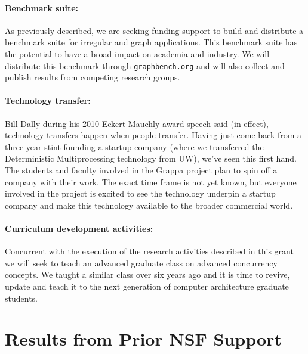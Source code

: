 \paragraph{Benchmark suite:} As previously described, we are seeking funding support to build and distribute a benchmark suite for irregular and graph applications.  This benchmark suite has the potential to have a broad impact on academia and industry.  We will distribute this benchmark through \texttt{graphbench.org} and will also collect and publish results from competing research groups.

\paragraph{Technology transfer:} Bill Dally during his 2010 Eckert-Mauchly award speech said (in effect), technology transfers happen when people transfer.  Having just come back from a three year stint founding a startup company (where we transferred the Deterministic Multiprocessing technology from UW), we've seen this first hand.  The students and faculty involved in the Grappa project plan to spin off a company with their work.  The exact time frame is not yet known, but everyone involved in the project is excited to see the technology underpin a startup company and make this technology available to the broader commercial world.

\paragraph{Curriculum development activities:} Concurrent with the execution of the research activities described in this grant we will seek to teach an advanced graduate class on advanced concurrency concepts.  We taught a similar class over six years ago and it is time to revive, update and teach it to the next generation of computer architecture graduate students.  


\section{Results from Prior NSF Support}

